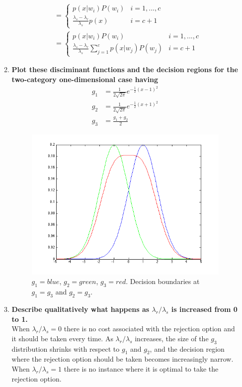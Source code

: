 \documentclass[12pt]{article}
\begin{document}
\begin{enumerate}
\begin{enumerate}
\begin{equation}
\begin{split}
      & = \left\{ \begin{array}{ll}p(x|w_i)P(w_i) & i = 1, ..., c \\ \frac{\lambda_s -\lambda_r}{\lambda_s}p(x) & i = c+1 \end{array} \right. \\
      & \boxed{= \left\{ \begin{array}{ll}p(x|w_i)P(w_i) & i = 1, ..., c \\ \frac{\lambda_s-\lambda_r}{\lambda_s}\sum_{j=1}^c p(x|w_j)P(w_j) & i = c+1 \end{array} \right.}
    \end{split}
    \end{equation}
  \item \textbf{Plot these disciminant functions and the decision regions for the two-category one-dimensional case having}
    \begin{equation}
    \begin{split}
      g_1& = \frac{1}{2\sqrt{2\pi}}e^{-\frac{1}{2}(x-1)^2} \\
      g_2& = \frac{1}{2\sqrt{2\pi}}e^{-\frac{1}{2}(x+1)^2} \\
      g_3& = \frac{g_1 + g_2}{2}
    \end{split}
    \end{equation}
    \begin{figure}[H]
      \includegraphics[width=\textwidth]{14b}
      \caption{$g_1 = blue$, $g_2 = green$, $g_3 = red$. Decision boundaries at $g_1 = g_3$ and $g_2 = g_3$.}
    \end{figure}
  \item \textbf{Describe qualitatively what happens as $\lambda_r/\lambda_s$ is increased from 0 to 1.} \\
  When $\lambda_r/\lambda_s = 0$ there is no cost associated with the rejection option and it should be taken every time. As $\lambda_r/\lambda_s$ increases, the size of the $g_3$ distribution shrinks with respect to $g_1$ and $g_2$, and the decision region where the rejection option should be taken becomes increasingly narrow. When $\lambda_r/\lambda_s = 1$ there is no instance where it is optimal to take the rejection option.
  \end{enumerate}
\end{enumerate}
 
\end{document}
